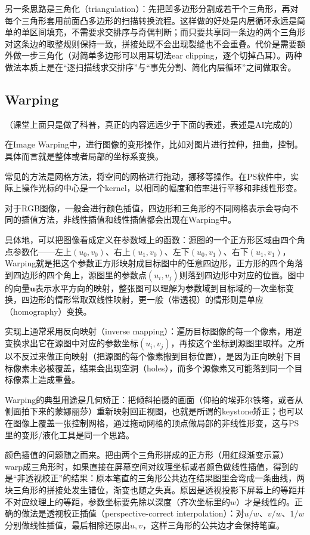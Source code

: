 另一条思路是三角化（triangulation）：先把凹多边形分割成若干个三角形，再对每个三角形套用前面凸多边形的扫描转换流程。这样做的好处是内层循环永远是简单的单区间填充，不需要求交排序与奇偶判断；而只要共享同一条边的两个三角形对这条边的取整规则保持一致，拼接处既不会出现裂缝也不会重叠。代价是需要额外做一步三角化（对简单多边形可以用耳切法ear clipping，逐个切掉凸耳）。两种做法本质上是在“逐扫描线求交排序”与“事先分割、简化内层循环”之间做取舍。

\subsection{Warping}
（课堂上面只是做了科普，真正的内容远远少于下面的表述，表述是AI完成的）

在Image Warping中，进行图像的变形操作，比如对图片进行拉伸，扭曲，控制。具体而言就是整体或者局部的坐标系变换。

常见的方法是网格方法，将空间的网格进行拖动，挪移等操作。在PS软件中，实际上操作光标的中心是一个kernel，以相同的幅度和倍率进行平移和非线性形变。

对于RGB图像，一般会进行颜色插值，四边形和三角形的不同网格表示会导向不同的插值方法，非线性插值和线性插值都会出现在Warping中。

具体地，可以把图像看成定义在参数域上的函数：源图的一个正方形区域由四个角点参数化——左上$(u_0,v_0)$、右上$(u_1,v_0)$、左下$(u_0,v_1)$、右下$(u_1,v_1)$，Warping就是把这个参数正方形映射成目标图中的任意四边形，正方形的四个角落到四边形的四个角上，源图里的参数点$(u_i,v_j)$则落到四边形中对应的位置。图中的向量$\boldsymbol{u}$表示水平方向的映射，整张图可以理解为参数域到目标域的一次坐标变换，四边形的情形常取双线性映射，更一般（带透视）的情形则是单应（homography）变换。

实现上通常采用反向映射（inverse mapping）：遍历目标图像的每一个像素，用逆变换求出它在源图中对应的参数坐标$(u_i,v_j)$，再按这个坐标到源图里取样。之所以不反过来做正向映射（把源图的每个像素搬到目标位置），是因为正向映射下目标像素未必被覆盖，结果会出现空洞（holes），而多个源像素又可能落到同一个目标像素上造成重叠。

Warping的典型用途是几何矫正：把倾斜拍摄的画面（仰拍的埃菲尔铁塔，或者从侧面拍下来的蒙娜丽莎）重新映射回正视图，也就是所谓的keystone矫正；也可以在图像上覆盖一张控制网格，通过拖动网格的顶点做局部的非线性形变，这与PS里的变形/液化工具是同一个思路。

颜色插值的问题随之而来。把由两个三角形拼成的正方形（用红绿渐变示意）warp成三角形时，如果直接在屏幕空间对纹理坐标或者颜色做线性插值，得到的是“非透视校正”的结果：原本笔直的三角形公共边在结果图里会弯成一条曲线，两块三角形的拼接处发生错位，渐变也随之失真。原因是透视投影下屏幕上的等距并不对应纹理上的等距，参数坐标要先除以深度（齐次坐标里的$w$）才是线性的。正确的做法是透视校正插值（perspective-correct interpolation）：对$u/w$、$v/w$、$1/w$分别做线性插值，最后相除还原出$u,v$，这样三角形的公共边才会保持笔直。

